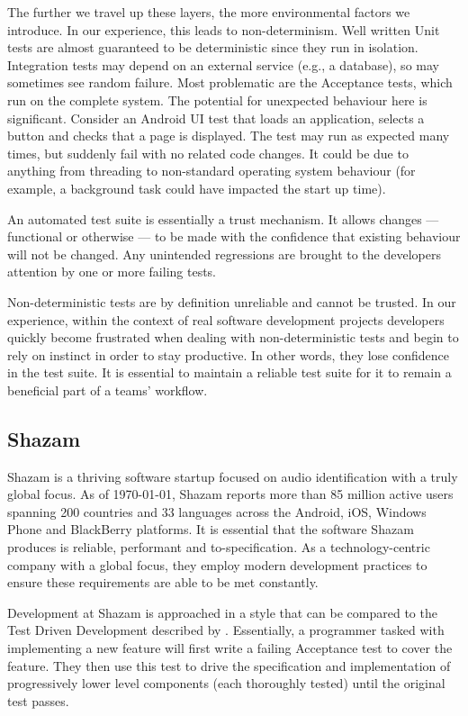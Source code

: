 The further we travel up these layers, the more environmental factors we introduce. In our experience, this leads to non-determinism. Well written Unit tests are almost guaranteed to be deterministic since they run in isolation. Integration tests may depend on an external service (e.g., a database), so may sometimes see random failure. Most problematic are the Acceptance tests, which run on the complete system. The potential for unexpected behaviour here is significant. Consider an Android UI test that loads an application, selects a button and checks that a page is displayed. The test may run as expected many times, but suddenly fail with no related code changes. It could be due to anything from threading to non-standard operating system behaviour (for example, a background task could have impacted the start up time).

An automated test suite is essentially a trust mechanism. It allows changes --- functional or otherwise --- to be made with the confidence that existing behaviour will not be changed. Any unintended regressions are brought to the developers attention by one or more failing tests.

Non-deterministic tests are by definition unreliable and cannot be trusted. In our experience, within the context of real software development projects developers quickly become frustrated when dealing with non-deterministic tests and begin to rely on instinct in order to stay productive. In other words, they lose confidence in the test suite. It is essential to maintain a reliable test suite for it to remain a beneficial part of a teams' workflow.

\subsection{Shazam}

Shazam is a thriving software startup focused on audio identification with a truly global focus. As of \today, Shazam reports more than 85 million active users spanning 200 countries and 33 languages across the Android, iOS, Windows Phone and BlackBerry platforms. It is essential that the software Shazam produces is reliable, performant and to-specification. As a technology-centric company with a global focus, they employ modern development practices to ensure these requirements are able to be met constantly.

Development at Shazam is approached in a style that can be compared to the Test Driven Development described by \citet*{freeman2009growing}. Essentially, a programmer tasked with implementing a new feature will first write a failing Acceptance test to cover the feature. They then use this test to drive the specification and implementation of progressively lower level components (each thoroughly tested) until the original test passes.

